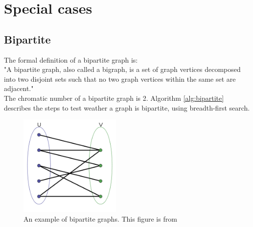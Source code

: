 \documentclass[a4paper]{report}
\begin{document}
		\section{Special cases}
			\subsection{Bipartite}
			The formal definition of a bipartite graph is: \\
			"A bipartite graph, also called a bigraph, is a set of graph vertices decomposed into two disjoint sets such that no two graph vertices within the same set are adjacent." \cite{bipartiteDef} \\
			The chromatic number of a bipartite graph is 2. Algorithm \ref{alg:bipartite} \cite{bipartite} describes the steps to test weather a graph is bipartite, using breadth-first search. \\
			
			\begin{figure}[h]
				\centering
				\includegraphics[width=50mm,scale=0.5]{figures/bipartite.png}
				\caption{An example of bipartite graphs. This figure is from \protect\cite{bipartiteFig}}
				\label{fig:bipartite}
			\end{figure}
			
\end{document}
